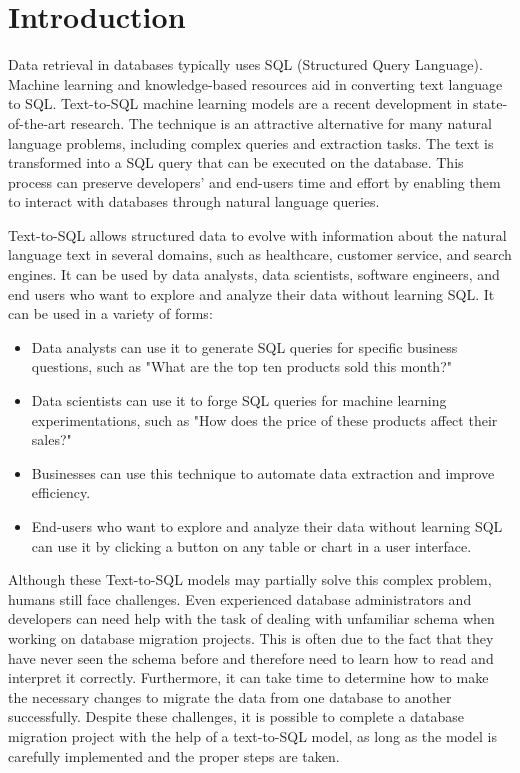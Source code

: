 \section{Introduction}

Data retrieval in databases typically uses SQL (Structured Query Language). Machine learning and knowledge-based resources aid in converting text language to SQL. Text-to-SQL machine learning models are a recent development in state-of-the-art research. The technique is an attractive alternative for many natural language problems, including complex queries and extraction tasks. The text is transformed into a SQL query that can be executed on the database. This process can preserve developers' and end-users time and effort by enabling them to interact with databases through natural language queries.

Text-to-SQL allows structured data to evolve with information about the natural language text in several domains, such as healthcare, customer service, and search engines. It can be used by data analysts, data scientists, software engineers, and end users who want to explore and analyze their data without learning SQL. It can be used in a variety of forms:

\begin{itemize}
    \item Data analysts can use it to generate SQL queries for specific business questions, such as "What are the top ten products sold this month?"
    \item Data scientists can use it to forge SQL queries for machine learning experimentations, such as "How does the price of these products affect their sales?"
    \item Businesses can use this technique to automate data extraction and improve efficiency.
    \item End-users who want to explore and analyze their data without learning SQL can use it by clicking a button on any table or chart in a user interface.
\end{itemize}

Although these Text-to-SQL models may partially solve this complex problem, humans still face challenges. Even experienced database administrators and developers can need help with the task of dealing with unfamiliar schema when working on database migration projects. This is often due to the fact that they have never seen the schema before and therefore need to learn how to read and interpret it correctly. Furthermore, it can take time to determine how to make the necessary changes to migrate the data from one database to another successfully. Despite these challenges, it is possible to complete a database migration project with the help of a text-to-SQL model, as long as the model is carefully implemented and the proper steps are taken.

